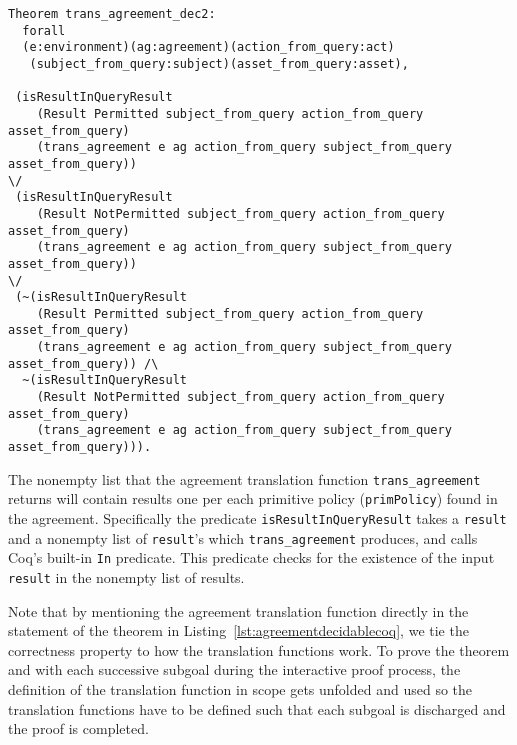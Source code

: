 \documentclass[runningheads,a4paper]{llncs}
\newcommand{\syn}{\texttt}
\begin{document}
\begin{lstlisting}
Theorem trans_agreement_dec2:
  forall
  (e:environment)(ag:agreement)(action_from_query:act)
   (subject_from_query:subject)(asset_from_query:asset),
   
 (isResultInQueryResult 
    (Result Permitted subject_from_query action_from_query asset_from_query)
    (trans_agreement e ag action_from_query subject_from_query asset_from_query)) 
\/
 (isResultInQueryResult 
    (Result NotPermitted subject_from_query action_from_query asset_from_query)
    (trans_agreement e ag action_from_query subject_from_query asset_from_query))
\/
 (~(isResultInQueryResult 
    (Result Permitted subject_from_query action_from_query asset_from_query)
    (trans_agreement e ag action_from_query subject_from_query asset_from_query)) /\
  ~(isResultInQueryResult 
    (Result NotPermitted subject_from_query action_from_query asset_from_query)
    (trans_agreement e ag action_from_query subject_from_query asset_from_query))).
\end{lstlisting}

The nonempty list that the agreement translation function \syn{trans_agreement} returns will contain results one per each primitive policy (\syn{primPolicy}) found in the agreement. Specifically the predicate \syn{isResultInQueryResult} takes a \syn{result} and a nonempty list of \syn{result}'s which \syn{trans_agreement} produces, and calls Coq's built-in \syn{In} predicate. This predicate checks for the existence of the input \syn{result} in the nonempty list of results.

Note that by mentioning the agreement translation function directly in the statement of the theorem in Listing~\ref{lst:agreementdecidablecoq}, we tie the correctness property to how the translation functions work. To prove the theorem and with each successive subgoal during the interactive proof process, the definition of the translation function in scope gets unfolded and used so the translation functions have to be defined such that each subgoal is discharged and the proof is completed. 

\end{document}
